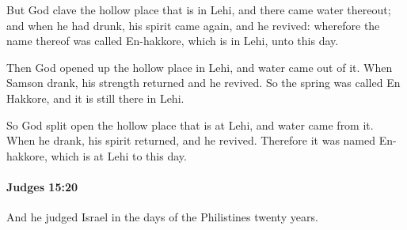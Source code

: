 			\begin{versebox}
					\item[BHS] 
					\item[ASV] But God clave the hollow place that is in Lehi, and there came water thereout; and when he had drunk, his spirit came again, and he revived: wherefore the name thereof was called En-hakkore, which is in Lehi, unto this day.
					\item[NIV] Then God opened up the hollow place in Lehi, and water came out of it. When Samson drank, his strength returned and he revived. So the spring was called En Hakkore, and it is still there in Lehi.
					\item[NRSV] So God split open the hollow place that is at Lehi, and water came from it. When he drank, his spirit returned, and he revived. Therefore it was named En-hakkore, which is at Lehi to this day.
			\end{versebox}

		\paragraph{Judges 15:20} %
			\label{JUDGES-15-20}

			And he judged Israel in the days of the Philistines twenty years.

